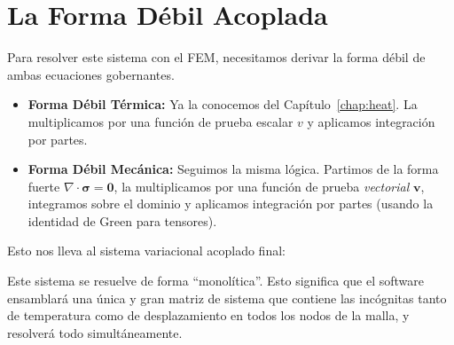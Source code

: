 \section{La Forma Débil Acoplada}
\label{sec:thermo-weak}
Para resolver este sistema con el FEM, necesitamos derivar la forma débil de ambas ecuaciones gobernantes.
\begin{itemize}
    \item \textbf{Forma Débil Térmica:} Ya la conocemos del Capítulo~\ref{chap:heat}. La multiplicamos por una función de prueba escalar \(v\) y aplicamos integración por partes.
    \item \textbf{Forma Débil Mecánica:} Seguimos la misma lógica. Partimos de la forma fuerte \(\nabla \cdot \bm{\sigma} = \bm{0}\), la multiplicamos por una función de prueba \textit{vectorial} \(\bm{v}\), integramos sobre el dominio y aplicamos integración por partes (usando la identidad de Green para tensores).
\end{itemize}
Esto nos lleva al sistema variacional acoplado final:

\begin{center}
\end{center}

Este sistema se resuelve de forma ``monolítica''. Esto significa que el software ensamblará una única y gran matriz de sistema que contiene las incógnitas tanto de temperatura como de desplazamiento en todos los nodos de la malla, y resolverá todo simultáneamente.


